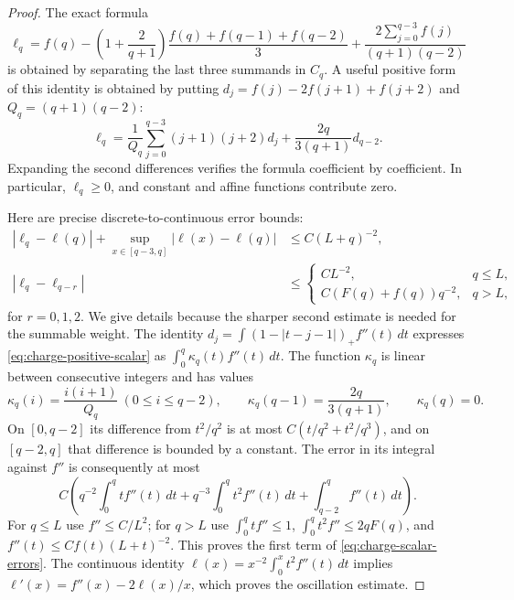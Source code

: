 \begin{proof}
The exact formula
\begin{equation}\label{eq:charge-scalar-exact}
 \ell_q=f(q)-\left(1+\frac2{q+1}\right)
 \frac{f(q)+f(q-1)+f(q-2)}3
 +\frac{2\sum_{j=0}^{q-3}f(j)}{(q+1)(q-2)}
\end{equation}
is obtained by separating the last three summands in $C_q$.
A useful positive form of this identity is obtained by putting
$d_j=f(j)-2f(j+1)+f(j+2)$ and $Q_q=(q+1)(q-2)$:
\begin{equation}\label{eq:charge-positive-scalar}
 \ell_q=\frac1{Q_q}\sum_{j=0}^{q-3}(j+1)(j+2)d_j
       +\frac{2q}{3(q+1)}d_{q-2}.
\end{equation}
Expanding the second differences verifies the formula coefficient by
coefficient.  In particular, $\ell_q\ge0$, and constant and affine
functions contribute zero.

Here are precise discrete-to-continuous error bounds:
\begin{align}
 |\ell_q-\ell(q)|+
 \sup_{x\in[q-3,q]}|\ell(x)-\ell(q)|
 &\le C(L+q)^{-2},\label{eq:charge-scalar-errors}\\
 |\ell_q-\ell_{q-r}|
 &\le
 \begin{cases}
 C L^{-2},&q\le L,\\
 C(F(q)+f(q))q^{-2},&q>L,
 \end{cases}\label{eq:charge-scalar-differences}
\end{align}
for $r=0,1,2$.  We give details because the sharper second estimate is
needed for the summable weight.  The identity
$d_j=\int (1-|t-j-1|)_+f''(t)\,dt$ expresses
\eqref{eq:charge-positive-scalar} as $\int_0^q \kappa_q(t)f''(t)\,dt$.
The function $\kappa_q$ is linear between consecutive integers and has values
\[
 \kappa_q(i)=\frac{i(i+1)}{Q_q}\ (0\le i\le q-2),\qquad
 \kappa_q(q-1)=\frac{2q}{3(q+1)},\qquad \kappa_q(q)=0.
\]
On $[0,q-2]$ its difference from $t^2/q^2$ is at most
$C(t/q^2+t^2/q^3)$, and on $[q-2,q]$ that difference is bounded by a
constant.  The error in its integral against $f''$ is consequently at
most
\[
 C\left(q^{-2}\int_0^q tf''(t)\,dt+
 q^{-3}\int_0^q t^2f''(t)\,dt+
 \int_{q-2}^q f''(t)\,dt\right).
\]
For $q\le L$ use $f''\le C/L^2$; for $q>L$ use
$\int_0^q tf''\le1$, $\int_0^q t^2f''\le2qF(q)$, and
$f''(t)\le C f(t)(L+t)^{-2}$.  This proves the first term of
\eqref{eq:charge-scalar-errors}.  The continuous identity
$\ell(x)=x^{-2}\int_0^x t^2f''(t)\,dt$ implies
$\ell'(x)=f''(x)-2\ell(x)/x$, which proves the oscillation estimate.


\end{proof}
